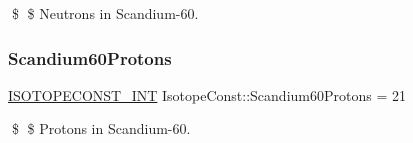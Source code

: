 \$ \$ Neutrons in Scandium-\/60. \mbox{\label{group___isotope_const-_scandium-_sc60_gaeefbaa0c718715cd009d40a36945dd6d}} 
\subsubsection{\texorpdfstring{Scandium60\+Protons}{Scandium60Protons}}
{\footnotesize\ttfamily \mbox{\hyperlink{group___isotope_const-_macros_ga5f18360b3e99483a35c32d789e62621c}{I\+S\+O\+T\+O\+P\+E\+C\+O\+N\+S\+T\+\_\+\+I\+NT}} Isotope\+Const\+::\+Scandium60\+Protons = 21}

\$ \$ Protons in Scandium-\/60. 